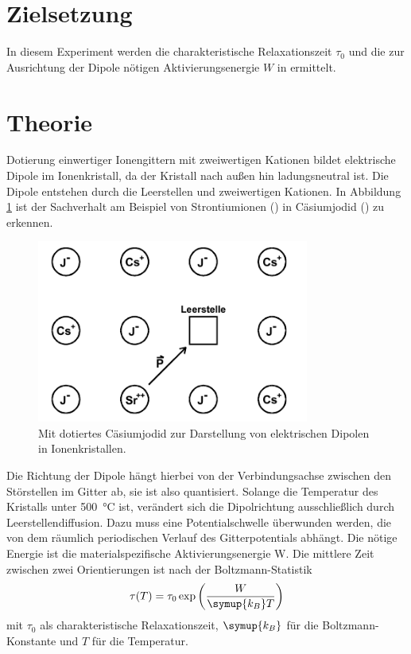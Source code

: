 \section{Zielsetzung}
\label{sec:Zielsetzung}
In diesem Experiment werden die charakteristische Relaxationszeit $\tau_0$ und die zur Ausrichtung der Dipole nötigen Aktivierungsenergie $W$ in  ermittelt. 
\section{Theorie}
\label{sec:Theorie}
Dotierung einwertiger Ionengittern mit zweiwertigen Kationen bildet elektrische Dipole im Ionenkristall, da der Kristall nach außen hin ladungsneutral ist.
Die Dipole entstehen durch die Leerstellen und zweiwertigen Kationen.
In Abbildung \ref{fig:Dipol} ist der Sachverhalt am Beispiel von Strontiumionen () in Cäsiumjodid () zu erkennen.
\begin{figure}[htb]
  \centering
  \includegraphics[height=6cm]{pics/Dipole.png}
  \caption{Mit  dotiertes Cäsiumjodid  zur Darstellung von elektrischen Dipolen in Ionenkristallen. \cite{anleitung}}
  \label{fig:Dipol}
\end{figure}
\FloatBarrier

Die Richtung der Dipole hängt hierbei von der Verbindungsachse zwischen den Störstellen im Gitter ab, sie ist also quantisiert.
Solange die Temperatur des Kristalls unter \SI{500}{\celsius} ist, verändert sich die Dipolrichtung ausschließlich durch Leerstellendiffusion.
Dazu muss eine Potentialschwelle überwunden werden, die von dem räumlich periodischen Verlauf des Gitterpotentials abhängt.
Die nötige Energie ist die materialspezifische Aktivierungsenergie W.
Die mittlere Zeit zwischen zwei Orientierungen ist nach der Boltzmann-Statistik
\begin{equation}
    \label{eqn:Relaxzeit}
    \tau(T) = \tau_0 \exp\left(\frac{W}{\symup{k_B} T}\right)
\end{equation}
mit $\tau_0$ als charakteristische Relaxationszeit, $\symup{k_B}$ für die Boltzmann-Konstante und $T$ für die Temperatur.

